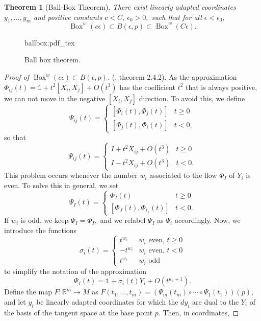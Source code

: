 \documentclass[12pt, letterpaper, reqno]{amsart}
\newcommand{\incfig}[2][1]{%
    \def\svgwidth{#1\columnwidth}
    {#2.pdf_tex}
}
\theoremstyle{definition}
\theoremstyle{plain}
\newtheorem{thm}{Theorem}
\theoremstyle{remark}
\begin{document}
\begin{thm}[Ball-Box Theorem]
	There exist linearly adapted coordinates $ y_1,\dots,y_m $ and positive constants $ c<C, \ \epsilon_0>0, $ such that for all $ \epsilon<\epsilon_0, $ 
	$$ \operatorname{Box}^w(c\epsilon)\subset B(\epsilon, p)\subset \operatorname{Box}^w(C\epsilon).    $$ 
\end{thm}
\begin{figure}[ht]
    \centering
    \incfig{ballbox}
    \caption{Ball box theorem.}
    \label{fig:ballbox}
\end{figure}
\begin{proof}[Proof of $\operatorname{Box}^w(c\epsilon)\subset B(\epsilon, p)$] (\cite{montgomery2002tour}, theorem 2.4.2). As the approximation $ \Phi_{ij}(t)= \mathbb{1} + t^2 \left[ X_i,X_j \right] + O(t^3)$ has the coefficient $ t^2 $ that is always positive, we can not move in the negative $ [X_i,X_j] $ direction. To avoid this, we define 
	$$ \Psi_{i j}(t)=\left\{\begin{array}{ll}{\left[\Phi_{i}(t), \Phi_{j}(t)\right]} & t \geq 0 \\ {\left[\Phi_{j}(t), \Phi_{i}(t)\right]} & t<0,\end{array}\right. $$ 
	so that
	$$\Psi_{i j}(t)=\left\{\begin{array}{ll}I+t^{2} X_{i j}+O\left(t^{3}\right) & t \geq 0 \\ I-t^{2} X_{i j}+O\left(t^{3}\right) & t<0.\end{array}\right.$$
This problem occurs whenever the number $ w_i $ associated to the flow $ \Phi_I $ of $ Y_i $ is even. To solve this in general, we set
$$\Psi_{I}(t)=\left\{\begin{array}{ll}
\Phi_{I}(t) & t \geq 0 \\
{\left[\Phi_{J}(t), \Phi_{i_{1}}(t)\right]} & t<0.
\end{array}\right.$$
If $ w_i $ is odd, we keep $ \Psi_I=\Phi_I, $ and we relabel $ \Psi_I $ as $ \Psi_i $ accordingly. Now, we introduce the functions
$$\sigma_{i}(t)=\left\{\begin{array}{ll}
t^{w_{i}} & w_{i} \text { even, } t \geq 0 \\
-t^{w_{i}} & w_{i} \text { even, } t<0 \\
t^{w_{i}} & w_{i} \text { odd }
\end{array}\right.
$$
to simplify the notation of the approximation
$$ \Psi_I(t)= \mathbb{1}+ \sigma_i(t) Y_i + O(t^{w_i+1}). $$ 
Define the map $ F: \mathbb{R}^m \rightarrow {M} $ as $ F(t_1,\dots,t_m) = \left( \Psi_m(t_m) \circ \cdots \circ \Psi_1(t_1)\right)(p), $ and let $ y_i $ be linearly adapted coordinates for which the $ dy_i $ are dual to the $ Y_i $ of the basis of the tangent space at the base point $ p. $ Then, in coordinates,


\end{proof}
\end{document}
